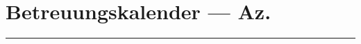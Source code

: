 \section{Betreuungskalender --- Az.}\label{betreuungskalender-az.}

\begin{center}\rule{0.5\linewidth}{0.5pt}\end{center}
